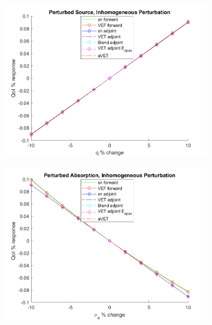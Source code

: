 \documentclass[12pt]{report}
\begin{document}
\begin{figure}[H]
\centering
\begin{subfigure}{.5\textwidth}
  \centering
  \includegraphics[width=.98\linewidth]{figures2/23qSens.png}
\end{subfigure}%
\begin{subfigure}{.5\textwidth}
  \centering
  \includegraphics[width=.98\linewidth]{figures2/23sigaSens.png}
\end{subfigure}
%
\begin{subfigure}{.5\textwidth}
  \centering

\end{subfigure}
\end{figure}
\end{document}
